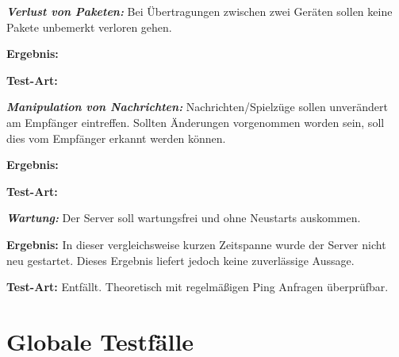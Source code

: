 \documentclass[parskip=full]{scrartcl}
\begin{document}
\begin{description}
	\item[NF1060] \textbf{\textit{Verlust von Paketen: }} Bei Übertragungen zwischen zwei Geräten sollen keine Pakete unbemerkt verloren gehen.
	\item \textbf{Ergebnis: }
	\item \textbf{Test-Art: }
	
	\item[NF1070] \textbf{\textit{Manipulation von Nachrichten: }} Nachrichten/Spielzüge sollen unverändert am Empfänger eintreffen. Sollten Änderungen vorgenommen worden sein, soll dies vom Empfänger erkannt werden können.
	\item \textbf{Ergebnis: }
	\item \textbf{Test-Art: }
	
	\item[NF1080] \textbf{\textit{Wartung: }} Der Server soll wartungsfrei und ohne Neustarts auskommen.
	\item \textbf{Ergebnis: } In dieser vergleichsweise kurzen Zeitspanne wurde der Server nicht neu gestartet. Dieses Ergebnis liefert jedoch keine zuverlässige Aussage.
	\item \textbf{Test-Art: } Entfällt. Theoretisch mit regelmäßigen Ping Anfragen überprüfbar.
	
	
\end{description}

\section{Globale Testfälle}
\end{document}
